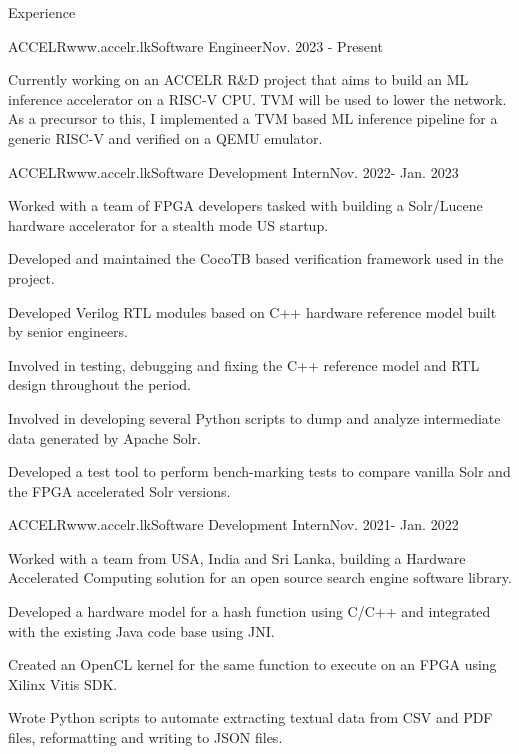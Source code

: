 \documentclass[
	11pt, %
]{./assets/resume} %
\begin{document}
\begin{rSection}{Experience}

	\begin{rSubsectionX}{ACCELR}{www.accelr.lk}{Software Engineer}{Nov. 2023 - Present}
		\item Currently working on an ACCELR R\&D project that aims to build an ML inference accelerator on a RISC-V CPU. TVM will be used to lower the network. As a precursor to this, I implemented a TVM based ML inference pipeline for a generic RISC-V and verified on a QEMU emulator.
	\end{rSubsectionX}

	\begin{rSubsectionX}{ACCELR}{www.accelr.lk}{Software Development Intern}{Nov. 2022- Jan. 2023}
            \item Worked with a team of FPGA developers tasked with building a Solr/Lucene hardware accelerator for a stealth mode US startup.
            \item Developed and maintained the CocoTB based verification framework used in the project. \ \item Developed Verilog RTL modules based on C++ hardware reference model built by senior engineers.
            \item Involved in testing, debugging and fixing the C++ reference model and RTL design throughout the period.
            \item Involved in developing several Python scripts to dump and analyze intermediate data generated by Apache Solr.
            \item Developed a test tool to perform bench-marking tests to compare vanilla Solr and the FPGA accelerated Solr versions.
	\end{rSubsectionX}

	\begin{rSubsectionX}{ACCELR}{www.accelr.lk}{Software Development Intern}{Nov. 2021- Jan. 2022}
            \item Worked with a team from USA, India and Sri Lanka, building a Hardware Accelerated Computing solution for an open source search engine software library.
            \item Developed a hardware model for a hash function using C/C++ and integrated with the existing Java code base using JNI.
            \item Created an OpenCL kernel for the same function to execute on an FPGA using Xilinx Vitis SDK.
            \item Wrote Python scripts to automate extracting textual data from CSV and PDF files, reformatting and writing to JSON files.

	\end{rSubsectionX}

\end{rSection}
\end{document}
